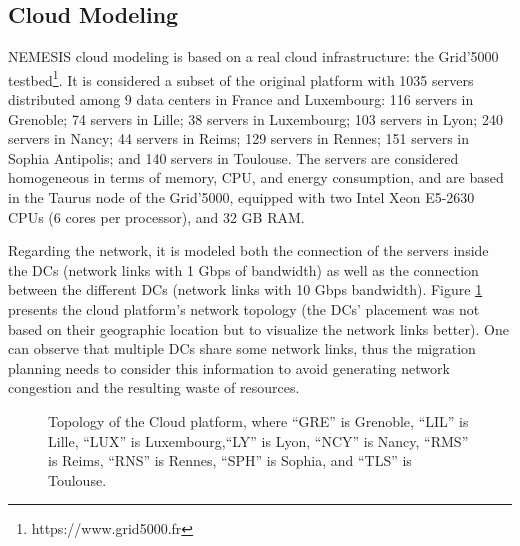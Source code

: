 \subsection{Cloud Modeling}\label{sec:cloud_model}

NEMESIS cloud modeling is based on a real cloud infrastructure: the Grid'5000 testbed\footnote{https://www.grid5000.fr}. It is considered a subset of the original platform with 1035 servers distributed among 9 data centers in France and Luxembourg: 116 servers in Grenoble; 74 servers in Lille; 38 servers in Luxembourg; 103 servers in Lyon; 240 servers in Nancy; 44 servers in Reims;  129 servers in Rennes;  151 servers in Sophia Antipolis; and 140 servers in Toulouse. The servers are considered homogeneous in terms of memory, CPU, and energy consumption, and are based in the Taurus node of the Grid'5000, equipped with two Intel Xeon E5-2630 CPUs (6 cores per processor), and 32 GB RAM.

Regarding the network, it is modeled both the connection of the servers inside the DCs (network links with 1 Gbps of bandwidth) as well as the connection between the different DCs  (network links with 10 Gbps bandwidth). Figure \ref{fig:topology} presents the cloud platform's network topology (the DCs' placement was not based on their geographic location but to visualize the network links better). One can observe that multiple DCs share some network links, thus the migration planning needs to consider this information to avoid generating network congestion and the resulting waste of resources.

\begin{figure}[ht]
  \centering
   {}
  \caption{Topology of the Cloud platform, where ``GRE'' is Grenoble,  ``LIL'' is Lille, ``LUX'' is Luxembourg,``LY'' is Lyon, ``NCY'' is Nancy, ``RMS'' is Reims,  ``RNS'' is Rennes, ``SPH'' is Sophia, and  ``TLS'' is Toulouse.}
  \label{fig:topology}
 \end{figure}
 


